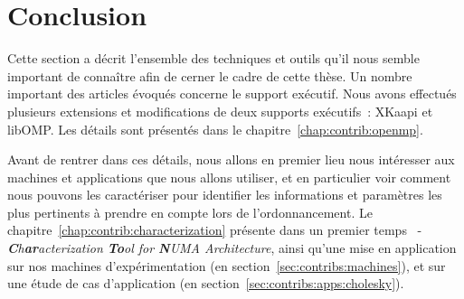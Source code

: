 





\section*{Conclusion}

Cette section a décrit l'ensemble des techniques et outils qu'il nous semble important de connaître afin de cerner le cadre de cette thèse.
Un nombre important des articles évoqués concerne le support exécutif.
Nous avons effectués plusieurs extensions et modifications de deux supports exécutifs~: XKaapi et libOMP. Les détails sont présentés dans le chapitre~\ref{chap:contrib:openmp}.

Avant de rentrer dans ces détails, nous allons en premier lieu nous intéresser aux machines et applications que nous allons utiliser, et en particulier voir comment nous pouvons les caractériser pour identifier les informations et paramètres les plus pertinents à prendre en compte lors de l'ordonnancement.
Le chapitre~\ref{chap:contrib:characterization} présente dans un premier temps \outil~- \emph{\textbf{C}h\textbf{ar}acterization \textbf{To}ol for \textbf{N}UMA Architecture}, ainsi qu'une mise en application sur nos machines d'expérimentation (en section~\ref{sec:contribs:machines}), et sur une étude de cas d'application (en section~\ref{sec:contribs:apps:cholesky}).


